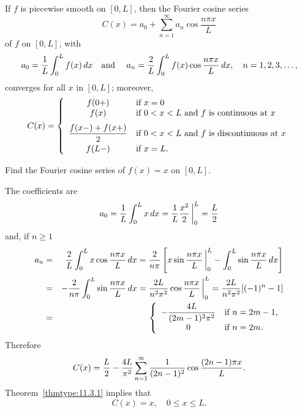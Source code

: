 \begin{theorem}
  \color{blue}
  \label{thmtype:11.3.1} If $f$ is piecewise smooth on $[0,L]$, then the Fourier cosine series
  \[
    C(x)=a_{0}+\sum_{n=1}^{\infty}a_{n}\cos\frac{n\pi x}{L}
  \]
  of $f$ on $[0,L]$, with
  \[
    a_{0}=\frac{1}{L}\int_{0}^{L}f(x)\,dx \mbox{\quad and \quad}a_{n}=\frac{2}{L}\int_{0}^{L}f(x)\cos\frac{n\pi x}{L}\,dx,\quad n=1,2,3,\dots,
  \]
  converges for all $x$ in $[0,L]$; moreover,
  \[
    C(x)= \left\{
    \begin{array}{cl}
      f(0+)                     & \mbox{if }x=0                                     \\
      f(x)                      & \mbox{if $0<x<L$ and $f$ is continuous at $x$}    \\[2\jot]
      \displaystyle\frac{f(x-)+f(x+)}{2} & \mbox{if $0<x<L$ and $f$ is discontinuous at $x$} \\[2\jot]
      f(L-)                     & \mbox{if }x=L.
    \end{array}\right.
  \]
\end{theorem}

\begin{example}
  \label{example:11.3.1} \rm Find the Fourier cosine series of $f(x)=x$ on $[0,L]$.
\end{example}

\begin{examplesolution}
\solution The coefficients are
\[
  a_{0}=\frac{1}{L}\int_{0}^{L}x\,dx=\frac{1}{L}\frac{x^{2}}{2}\,\bigg|_{0}^{L}=\frac{L}{2}
\]
and, if $n\ge1$
\begin{eqnarray*}
  a_{n}&=&\frac{2}{L}\int_{0}^{L}x\cos\frac{n\pi x}{L}\,dx =\frac{2}{n\pi}\left[x\sin\frac{n\pi x}{L}\,\bigg|_{0}^{L}- \int_{0}^{L} \sin\frac{n\pi x}{L}\,dx\right]\\ &=&-\frac{2}{n\pi}\int_{0}^{L} \sin\frac{n\pi x}{L}\,dx =\frac{2L}{n^{2}\pi^{2}}\cos\frac{n\pi x}{L}\,\bigg|_{0}^{L} =\frac{2L}{n^{2}\pi^{2}}[(-1)^{n}-1]\\ &=& \left\{
  \begin{array}{cl}
    \displaystyle-\frac{4L}{(2m-1)^{2}\pi^{2}} & \mbox{if $n=2m-1$}, \\
    0                                 & \mbox{if $n=2m$}.
  \end{array}\right.
\end{eqnarray*}
Therefore
\[
  C(x)=\displaystyle\frac{L}{2}-\frac{4L}{\pi^{2}}\sum_{n=1}^{\infty}\frac{1}{(2n-1)^{2}}\cos\frac{(2n-1)\pi x}{L}.
\]
Theorem~\ref{thmtype:11.3.1} implies that
\[
  C(x)=x,\quad0\le x\le L.
\]
\end{examplesolution}

